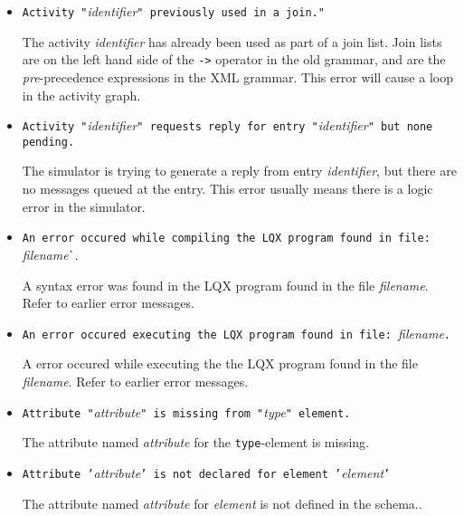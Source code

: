 \begin{itemize}
\item \texttt{Activity "}\emph{identifier}\texttt{" previously used in a join." }
  
  The activity \emph{identifier} has already been used as part of a
  join list.  Join lists are on the left hand
  side of the \texttt{->}\index{\texttt{->}} operator in the old
  grammar, and are the
  \emph{pre}-precedence expressions in the
  XML grammar.  This error will cause a loop in the activity graph.

\item \texttt{Activity "}\emph{identifier}\texttt{" requests reply for
    entry "}\emph{identifier}\texttt{" but none pending.}
  
  The simulator is trying to generate a reply from
  entry \emph{identifier}, but there are no messages queued at the
  entry.  This error usually means there is a logic error in the
  simulator.

\item \texttt{An error occured while compiling the LQX program found in file: }\emph{filename}\texttt`{.}
  
  A syntax error was found in the LQX program found in the file \emph{filename}.  Refer to
  earlier error messages.

\item \texttt{An error occured  executing the LQX program found in file: }\emph{filename}\texttt{.}
  
  A error occured while executing the the LQX program found in the file \emph{filename}.
  Refer to earlier error messages.

\item \texttt{Attribute "}\emph{attribute}\texttt{" is missing from "}\emph{type}\texttt{" element.}

  The attribute named \emph{attribute} for the \texttt{type}-element
  is missing.
  
\item \texttt{Attribute '}\emph{attribute}\texttt{' is not declared for element '}\emph{element}\texttt{'}
  
  The attribute named \emph{attribute} for \emph{element} is not defined in the
  schema..  


\end{itemize}
